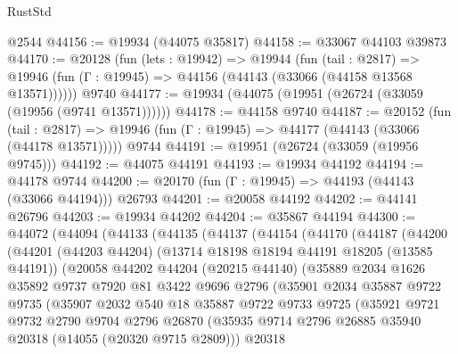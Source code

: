 \begin{lexlean}{RustStd}
\begin{coremodule}
    @2544
@44156 := @19934 (@44075 @35817)
@44158 := @33067 @44103 @39873
@44170 := @20128
    (fun (lets : @19942) =>
    @19944
      (fun (tail : @2817) =>
      @19946 (fun (Γ : @19945) => @44156 (@44143 (@33066 (@44158 @13568 @13571))))))
    @9740
@44177 := @19934 (@44075 (@19951 (@26724 (@33059 (@19956 (@9741 @13571))))))
@44178 := @44158 @9740
@44187 := @20152
    (fun (tail : @2817) => @19946 (fun (Γ : @19945) => @44177 (@44143 (@33066 (@44178 @13571)))))
    @9744
@44191 := @19951 (@26724 (@33059 (@19956 @9745)))
@44192 := @44075 @44191
@44193 := @19934 @44192
@44194 := @44178 @9744
@44200 := @20170 (fun (Γ : @19945) => @44193 (@44143 (@33066 @44194))) @26793
@44201 := @20058 @44192
@44202 := @44141 @26796
@44203 := @19934 @44202
@44204 := @35867 @44194
@44300 := @44072
    (@44094
      (@44133
        (@44135
          (@44137
            (@44154
              (@44170
                (@44187
                  (@44200
                    (@44201
                      (@44203 @44204)
                      (@13714 @18198 @18194 @44191 @18205 (@13585 @44191))
                      (@20058
                        @44202
                        @44204
                        (@20215 @44140)
                        (@35889
                          @2034
                          @1626
                          @35892
                          @9737
                          @7920
                          @81
                          @3422
                          @9696
                          @2796
                          (@35901
                            @2034
                            @35887
                            @9722
                            @9735
                            (@35907
                              @2032
                              @540
                              @18
                              @35887
                              @9722
                              @9733
                              @9725
                              (@35921
                                @9721
                                @9732
                                @2790
                                @9704
                                @2796
                                @26870
                                (@35935
                                  @9714
                                  @2796
                                  @26885
                                  @35940
                                  @20318
                                  (@14055 (@20320 @9715 @2809)))
                                @20318

\end{coremodule}
\end{lexlean}
